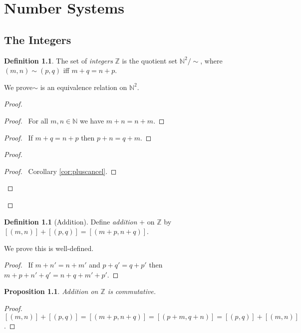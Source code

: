 \documentclass{book}
\let\qed\relax
\newtheorem{prop}[ax]{Proposition}
\theoremstyle{definition}
\newtheorem{df}[ax]{Definition}
\begin{document}
\chapter{Number Systems}

\section{The Integers}

\begin{df}
The set of \emph{integers} $\mathbb{Z}$ is the quotient set $\mathbb{N}^2 / \sim$, where $(m,n) \sim (p,q)$ iff $m + q = n + p$.

We prove$\sim$ is an equivalence relation on $\mathbb{N}^2$.
\end{df}

\begin{proof}
\pf
{}
\begin{proof}
	\pf\ For all $m,n \in \mathbb{N}$ we have $m + n = n + m$.
\end{proof}
\begin{proof}
	\pf\ If $m + q = n + p$ then $p + n = q + m$.
\end{proof}
\begin{proof}
	\begin{proof}
		\pf\ Corollary \ref{cor:pluscancel}.
	\end{proof}
\end{proof}
\qed
\end{proof}

\begin{df}[Addition]
Define \emph{addition} $+$ on $\mathbb{Z}$ by $[(m,n)] + [(p,q)] = [(m+p,n+q)]$.

We prove this is well-defined.
\end{df}

\begin{proof}
\pf\ If $m + n' = n + m'$ and $p + q' = q + p'$ then $m + p + n' + q' = n + q + m' + p'$. \qed
\end{proof}

\begin{prop}
\label{prop:plusZcomm}
Addition on $\mathbb{Z}$ is commutative.
\end{prop}

\begin{proof}
\pf\ $[(m,n)] + [(p,q)] = [(m+p,n+q)] = [(p+m,q+n)] = [(p,q)] + [(m,n)]$. \qed
\end{proof}
\end{document}
